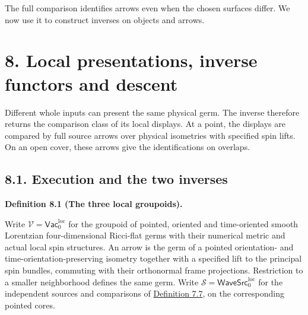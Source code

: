 \documentclass[
  english,
  11pt,
  reqno]{amsart}
\makeatletter
\newcommand{\pandocstatementheading}[1]{%
  \par\addpenalty{\@beginparpenalty}%
  \addvspace{.5\baselineskip plus .2\baselineskip minus .2\baselineskip}%
  {\normalfont\bfseries #1\par}%
  \nobreak\@afterindenttrue\@afterheading
}
\makeatother
\begin{document}
The full comparison identifies arrows even when the chosen surfaces
differ. We now use it to construct inverses on objects and arrows.

\section{8. Local presentations, inverse functors and
descent}\label{local-presentations-inverse-functors-and-descent}\label{sec:local-source-equivalence}

Different whole inputs can present the same physical germ. The inverse
therefore returns the comparison class of its local displays. At a
point, the displays are compared by full source arrows over physical
isometries with specified spin lifts. On an open cover, these arrows
give the identifications on overlaps.

\subsection{8.1. Execution and the two
inverses}\label{execution-and-the-two-inverses}\label{sec:local-display-inverses}

\pandocstatementheading{\leavevmode{}\label{def:local-display-groupoids}Definition 8.1 (The three local groupoids).}

Write \(\mathcal V=\mathsf{Vac}^{\mathrm{loc}}_0\) for the groupoid of
pointed, oriented and time-oriented smooth Lorentzian four-dimensional
Ricci-flat germs with their numerical metric and actual local spin
structures. An arrow is the germ of a pointed orientation- and
time-orientation-preserving isometry together with a specified lift to
the principal spin bundles, commuting with their orthonormal frame
projections. Restriction to a smaller neighborhood defines the same
germ. Write \(\mathcal S=\mathsf{WaveSrc}^{\mathrm{loc}}_0\) for the
independent sources and comparisons of
\hyperref[def:online-complete-independent-wave-source]{Definition 7.7},
on the corresponding pointed cores.
\end{document}
